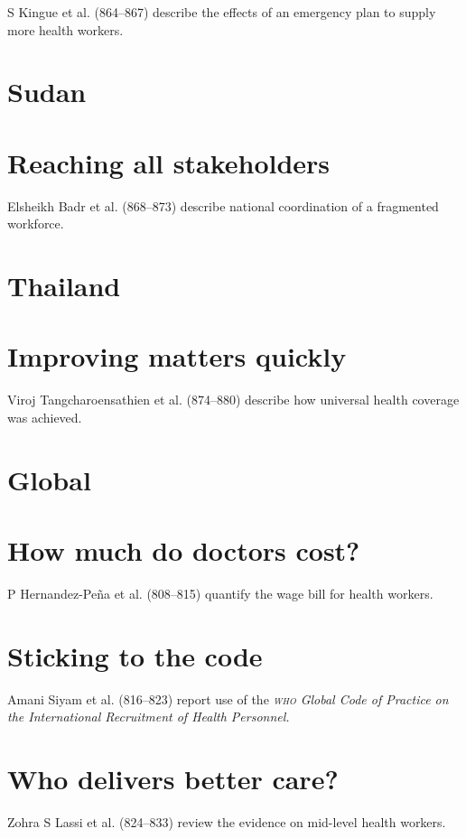 \documentclass{article}
\begin{document}
S Kingue et al. (864–867) describe the effects of an emergency plan to supply
more health
workers.

\section{Sudan}

\section{Reaching all stakeholders}

Elsheikh Badr et al. (868–873) describe national coordination of a fragmented
workforce.

\section{Thailand}

\section{Improving matters quickly}

Viroj Tangcharoensathien et al. (874–880) describe how universal health coverage
was
achieved.

\section{Global}

\section{How much do doctors cost?}

P Hernandez-Peña et al. (808–815) quantify the wage bill for health
workers.

\section{Sticking to the code}

Amani Siyam et al. (816–823) report use of the \textit{\textsc{who} Global Code of
Practice on the
International Recruitment of Health Personnel.}

\section{Who delivers better care?}

Zohra S Lassi et al. (824–833) review the evidence on mid-level health workers.
\end{document}
